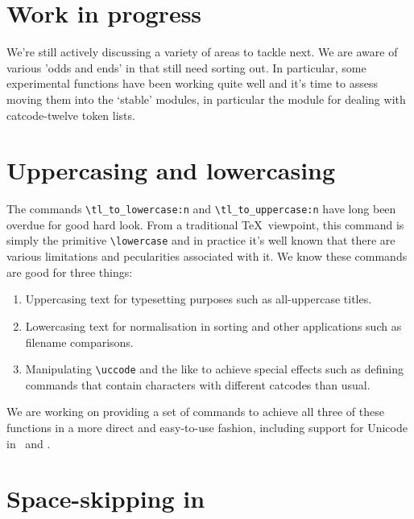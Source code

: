 \documentclass{ltnews}
\begin{document}
\section{Work in progress}

We're still actively discussing a variety of areas to tackle next.
We are aware of various 'odds and ends' in  that still need sorting out.
In particular, some experimental functions have been working quite well and it's time to assess moving them into the `stable' modules, in particular the  module for dealing with catcode-twelve token lists.

\section{Uppercasing and lowercasing}

The commands \verb"\tl_to_lowercase:n" and \verb"\tl_to_uppercase:n" have long been overdue for good hard look.
From a traditional \TeX\ viewpoint, this command is simply the primitive \verb"\lowercase" and in practice it's well known that there are various limitations and pecularities associated with it.
We know these commands are good for three things:
\begin{enumerate}
\item
Uppercasing text for typesetting purposes such as all-uppercase titles.
\item
Lowercasing text for normalisation in sorting and other applications such as filename comparisons.
\item
Manipulating \verb"\uccode" and the like to achieve special effects such as defining commands that contain characters with different catcodes than usual.
\end{enumerate}
We are working on providing a set of commands to achieve all three of these functions in a more direct and easy-to-use fashion, including support for Unicode in \LuaLaTeX\ and \XeLaTeX.

\section{Space-skipping in }
\end{document}
